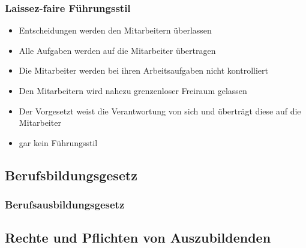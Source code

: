 \subsubsection{Laissez-faire Führungsstil}
\begin{itemize}
	\item Entscheidungen werden den Mitarbeitern überlassen
	\item Alle Aufgaben werden auf die Mitarbeiter übertragen
	\item Die Mitarbeiter werden bei ihren Arbeitsaufgaben nicht kontrolliert
	\item Den Mitarbeitern wird nahezu grenzenloser Freiraum gelassen
	\item Der Vorgesetzt weist die Verantwortung von sich und überträgt diese auf die Mitarbeiter
	\item \ql gar kein Führungsstil\qr
\end{itemize}


\subsection{Berufsbildungsgesetz}

\subsubsection{Berufsausbildungsgesetz}


\subsection{Rechte und Pflichten von Auszubildenden}

